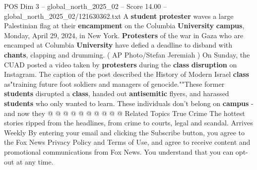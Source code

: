 \begin{textsample}{POS Dim 3 – global\_north\_2025\_02 – Score 14.00 – global\_north\_2025\_02/121630362.txt}
A \textbf{student} \textbf{protester} waves a large Palestinian flag at their \textbf{encampment} on the Columbia \textbf{University} \textbf{campus}, Monday, April 29, 2024, in New York. \textbf{Protesters} of the war in Gaza who are encamped at Columbia \textbf{University} have defied a deadline to disband with \textbf{chants}, clapping and drumming. ( AP Photo/Stefan Jeremiah ) On Sunday, the CUAD posted a video taken by \textbf{protesters} during the \textbf{class} \textbf{disruption} on Instagram.
The caption of the post described the History of Modern Israel \textbf{class} as"training future foot soldiers and managers of genocide.""These former \textbf{students} disrupted a \textbf{class}, handed out \textbf{antisemitic} flyers, and harassed \textbf{students} who only wanted to learn.
These individuals don't belong on \textbf{campus} - and now they @ @ @ @ @ @ @ @ @ @ Related Topics True Crime The hottest stories ripped from the headlines, from crime to courts, legal and scandal.
Arrives Weekly By entering your email and clicking the Subscribe button, you agree to the Fox News Privacy Policy and Terms of Use, and agree to receive content and promotional communications from Fox News.
You understand that you can opt-out at any time.

\end{textsample}
